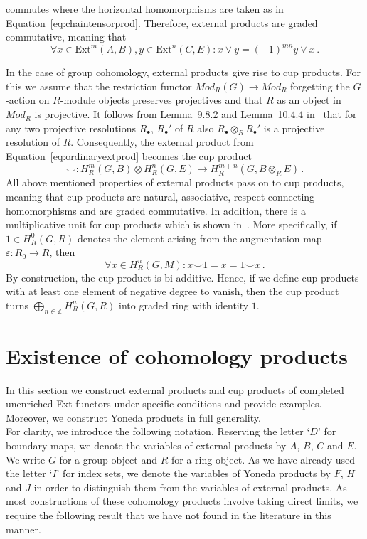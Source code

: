 \documentclass[12pt, a4paper]{article}
\numberwithin{equation}{section}
\theoremstyle{empty}
\theoremstyle{nonumberplain}
\begin{document}
commutes where the horizontal homomorphisms are taken as in Equation~\ref{eq:chaintensorprod}. Therefore, external products are graded commutative, meaning that
\begin{equation}\label{eq:extprodgradedcomm}
\forall x \in \mathrm{Ext}^m(A, B), y \in \mathrm{Ext}^n(C, E):
x \vee y = (-1)^{mn} y \vee x \, .
\end{equation}

In the case of group cohomology, external products give rise to cup products. For this we assume that the restriction functor $Mod_R(G) \rightarrow Mod_R$ forgetting the $G$-action on $R$-module objects preserves projectives and that $R$ as an object in $Mod_R$ is projective. It follows from Lemma~9.8.2 and Lemma~10.4.4 in~\cite{wil98} that for any two projective resolutions $R_{\bullet}$, $R_{\bullet}'$ of $R$ also $R_{\bullet} \otimes_R R_{\bullet}'$ is a projective resolution of $R$. Consequently, the external product from Equation~\ref{eq:ordinaryextprod} becomes the cup product
\begin{equation}\label{eq:ordinarycupprod}
\smile: H_R^m(G, B) \otimes H_R^n(G, E) \rightarrow H_R^{m+n}(G, B \otimes_R E) \, .
\end{equation}
All above mentioned properties of external products pass on to cup products, meaning that cup products are natural, associative, respect connecting homomorphisms and are graded commutative. In addition, there is a multiplicative unit for cup products which is shown in~\cite[p.~111]{bro82}. More specifically, if $1 \in H_R^0(G, R)$ denotes the element arising from the augmentation map $\varepsilon: R_0 \rightarrow R$, then
\[ \forall x \in H_R^n(G, M): x \smile 1 = x = 1 \smile x \, . \]
By construction, the cup product is bi-additive. Hence, if we define cup products with at least one element of negative degree to vanish, then the cup product turns $\bigoplus_{n \in \mathbb{Z}} H_R^n(G, R)$ into graded ring with identity $1$.

\section{Existence of cohomology products}\label{sec:cohomprodsexists}

In this section we construct external products and cup products of completed unenriched Ext-functors under specific conditions and provide examples. Moreover, we construct Yoneda products in full generality. \\

For clarity, we introduce the following notation. Reserving the letter `$D$' for boundary maps, we denote the variables of external products by $A$, $B$, $C$ and $E$. We write $G$ for a group object and $R$ for a ring object. As we have already used the letter `$I$' for index sets, we denote the variables of Yoneda products by $F$, $H$ and $J$ in order to distinguish them from the variables of external products. As most constructions of these cohomology products involve taking direct limits, we require the following result that we have not found in the literature in this manner.
\end{document}
